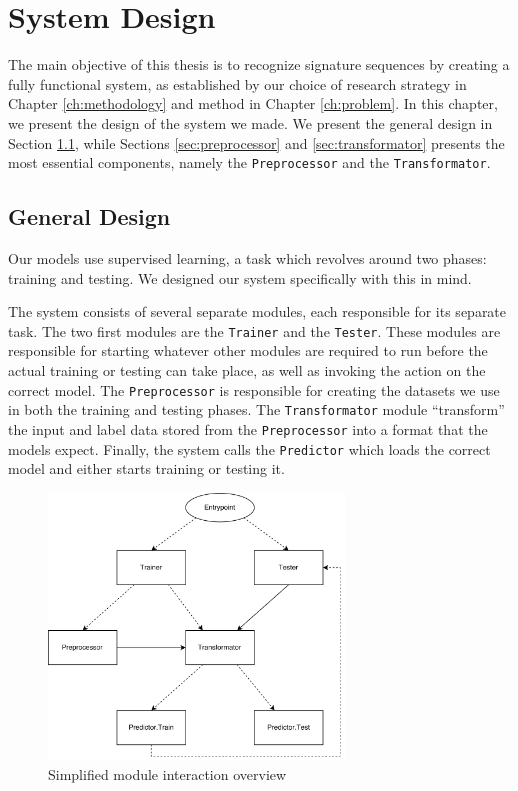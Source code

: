 
\chapter{System Design}
\label{ch:system_design}
The main objective of this thesis is to recognize signature sequences by creating a fully functional system, as established by our choice of research strategy in Chapter \ref{ch:methodology} and method in Chapter \ref{ch:problem}. In this chapter, we present the design of the system we made. We present the general design in Section \ref{sec:general_design}, while Sections \ref{sec:preprocessor} and \ref{sec:transformator} presents the most essential components, namely the {\tt Preprocessor} and the {\tt Transformator}.


\section{General Design}
\label{sec:general_design}
Our models use supervised learning, a task which revolves around two phases: training and testing. We designed our system specifically with this in mind.

The system consists of several separate modules, each responsible for its separate task. The two first modules are the {\tt Trainer} and the {\tt Tester}. These modules are responsible for starting whatever other modules are required to run before the actual training or testing can take place, as well as invoking the action on the correct model. The {\tt Preprocessor} is responsible for creating the datasets we use in both the training and testing phases. The {\tt Transformator} module ``transform'' the input and label data stored from the {\tt Preprocessor} into a format that the models expect. Finally, the system calls the {\tt Predictor} which loads the correct model and either starts training or testing it.

\newpage
\begin{figure}[ht]
    \centering
    \includegraphics[width=0.7\textwidth]{fig/system_design/system_design.png}
    \caption{Simplified module interaction overview}
    \label{fig:system-design}
\end{figure}

